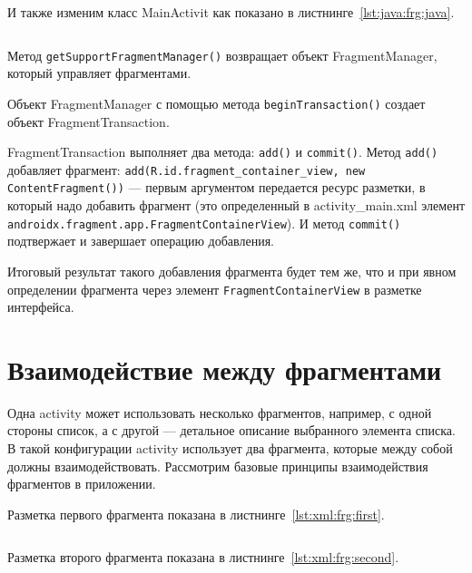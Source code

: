 И также изменим класс MainActivit как показано
в листнинге~\ref{lst:java:frg:java}.

\begin{lstlisting}[language=Java
	, caption=\leftline{Реализация фаргмента в Java коде}
	, label=lst:java:frg:java
	]
\end{lstlisting}

Метод \texttt{getSupportFragmentManager()} возвращает объект FragmentManager,
который управляет фрагментами.\par
Объект FragmentManager с помощью метода \texttt{beginTransaction()} создает
объект FragmentTransaction.\par
FragmentTransaction выполняет два метода: \texttt{add()} и \texttt{commit()}.
Метод \texttt{add()} добавляет фрагмент:
\texttt{add(R.id.fragment\_container\_view, new 
ContentFragment())} --- первым аргументом передается ресурс разметки, в
который надо добавить фрагмент (это определенный в activity\_main.xml
элемент \texttt{androidx.fragment.app.FragmentContainerView}).
И метод \texttt{commit()} подтвержает и завершает операцию добавления.\par
Итоговый результат такого добавления фрагмента будет тем же, что и при
явном определении фрагмента через элемент \texttt{FragmentContainerView} в
разметке интерфейса.

\section{Взаимодействие между фрагментами}
Одна activity может использовать несколько фрагментов, например, с одной
стороны список, а с другой --- детальное описание выбранного элемента
списка. В такой конфигурации activity использует два фрагмента, которые
между собой должны взаимодействовать. Рассмотрим базовые принципы
взаимодействия фрагментов в приложении.\par
Разметка первого фрагмента показана в листнинге~\ref{lst:xml:frg:first}.

\begin{lstlisting}[language=XML
	, caption=\leftline{}
	, label=lst:xml:frg:first
	]
\end{lstlisting}

Разметка второго фрагмента показана в листнинге~\ref{lst:xml:frg:second}.

\begin{lstlisting}[language=XML
	, caption=\leftline{}
	, label=lst:xml:frg:second
	]
\end{lstlisting}

